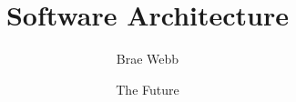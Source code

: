 \documentclass{csse4400}
\title{Software Architecture}
\author{Brae Webb}
\date{{\color{red} The Future}}
\begin{document}
\makecover





\end{document}

